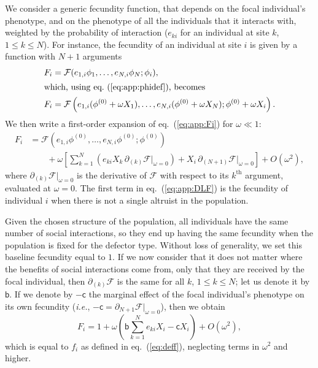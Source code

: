 \documentclass[11pt, letterpaper]{article}
\renewcommand{\eqref}[1]{\textup{{\normalfont eq.~(\ref{#1}}\normalfont)}}
\newcommand{\ie}{\textit{i.e.}}
\newcommand{\bigO}[1]{O\left( #1 \right)}
\newcommand{\bb}{\mathsf{b}}
\newcommand{\cc}{\mathsf{c}}
\begin{document}
We consider a generic fecundity function, that depends on the focal individual's phenotype, and on the phenotype of all the individuals that it interacts with, weighted by the probability of interaction ($e_{ki}$ for an individual at site $k$, $1\leq k\leq N$). For instance, the fecundity of an individual at site $i$ is given by a function with $N+1$ arguments
\begin{align}
F_i &= \mathcal{F}(e_{1,i} \phi_1, \dots, e_{N,i} \phi_N; \phi_i) \nonumber , \\
\intertext{which, using \eqref{eq:app:phidef}, becomes}
F_i & = \mathcal{F}\left(e_{1,i} (\phi^{(0)} + \omega X_1), \dots, e_{N,i} (\phi^{(0)} + \omega X_N); \phi^{(0)} + \omega X_i\right). \label{eq:app:Fi}
\end{align} 
%
We then write a first-order expansion of \eqref{eq:app:Fi} for $\omega \ll 1$:
\begin{align}\label{eq:app:DLF}
F_i & = \mathcal{F}\left(e_{1,i} \phi^{(0)}, \dots, e_{N,i} \phi^{(0)}; \phi^{(0)} \right) \nonumber \\
& \qquad + \omega \left[ \sum_{k=1}^N \left( e_{ki} X_k \, \partial_{(k)}\mathcal{F}|_{\omega=0} \right) + X_i \, \partial_{(N+1)}\mathcal{F}|_{\omega=0} \right] + \bigO{\omega^2}, 
\end{align}
where $\partial_{(k)}\mathcal{F}|_{\omega=0}$ is the derivative of $\mathcal{F}$ with respect to its $k^{\textrm{th}}$ argument, evaluated at $\omega=0$. The first term in \eqref{eq:app:DLF} is the fecundity of individual $i$ when there is not a single altruist in the population. 

Given the chosen structure of the population, all individuals have the same number of social interactions, so they end up having the same fecundity when the population is fixed for the defector type. Without loss of generality, we set this baseline fecundity equal to $1$. If we now consider that it does not matter where the benefits of social interactions come from, only that they are received by the focal individual, then $\partial_{(k)} \mathcal{F}$ is the same for all $k$, $1\leq k \leq N$; let us denote it by $\bb$. If we denote by $-\cc$ the marginal effect of the focal individual's phenotype on its own fecundity (\ie, $-\cc = \partial_{N+1}\mathcal{F}|_{\omega = 0}$), then we obtain
\begin{equation}
F_i = 1 + \omega \left(\bb \sum_{k=1}^N e_{ki} X_i - \cc X_i \right) + \bigO{\omega^2}, 
\end{equation}
which is equal to $f_i$ as defined in \eqref{eq:deff}, neglecting terms in $\omega^2$ and higher. 
\end{document}

